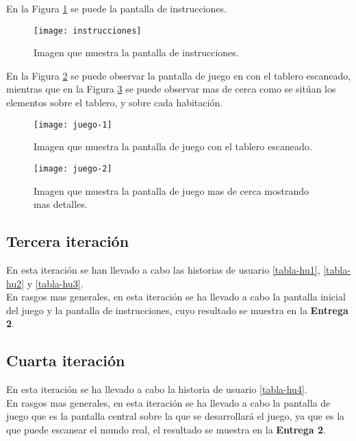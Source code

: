 \newpage

En la Figura \ref{figura-instrucciones} se puede la pantalla de instrucciones.

\begin{figure}[h]
  \centering
  \texttt{[image: instrucciones]}
  \caption{Imagen que muestra la pantalla de instrucciones.}
  \label{figura-instrucciones}
\end{figure}


En la Figura \ref{figura-juego-1} se puede observar la pantalla de juego en con el tablero escaneado, mientras que en la Figura \ref{figura-juego-2} se puede observar mas de cerca como se sitúan los elementos sobre el tablero, y sobre cada habitación.

\begin{figure}[h]
  \centering
  \texttt{[image: juego-1]}
  \caption{Imagen que muestra la pantalla de juego con el tablero escaneado.}
  \label{figura-juego-1}
\end{figure}

\begin{figure}[h]
  \centering
  \texttt{[image: juego-2]}
  \caption{Imagen que muestra la pantalla de juego mas de cerca mostrando mas detalles.}
  \label{figura-juego-2}
\end{figure}

\FloatBarrier


\subsection{Tercera iteración}
En esta iteración se han llevado a cabo las historias de usuario \ref{tabla-hu1}, \ref{tabla-hu2} y \ref{tabla-hu3}.\\

En rasgos mas generales, en esta iteración se ha llevado a cabo la pantalla inicial del juego y la pantalla de instrucciones, cuyo resultado se muestra en la \textbf{Entrega 2}.


\subsection{Cuarta iteración}
En esta iteración se ha llevado a cabo la historia de usuario \ref{tabla-hu4}.\\

En rasgos mas generales, en esta iteración se ha llevado a cabo la pantalla de juego que es la pantalla central sobre la que se desarrollará el juego, ya que es la que puede escanear el mundo real, el resultado se muestra en la \textbf{Entrega 2}.\\

